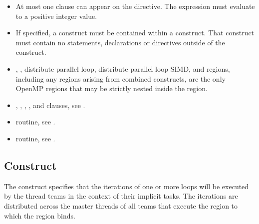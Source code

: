 {{{{\begin{itemize}
\item At most one  clause can appear on the directive. The 
expression must evaluate to a positive integer value.

\item If specified, a  construct must be contained within a  construct. That  construct must contain no statements, declarations or directives outside of the  construct.

\item {}, , distribute parallel loop,
distribute parallel loop SIMD, and  regions, including any
 regions arising from combined constructs, are the only OpenMP regions
that may be strictly nested inside the  region.

\end{itemize}

\crossreferences
\begin{itemize}

\item {}, , , , and  clauses, see 
.

\item {} routine, see 
.

\item {} routine, see 
.
\end{itemize}









\subsection{ Construct}
\label{subsec:distribute Construct}
\summary
The  construct specifies that the iterations of one or more loops will be 
executed by the thread teams in the context of their implicit tasks. The iterations are 
distributed across the master threads of all teams that execute the  region to 
which the  region binds.

}}}}
